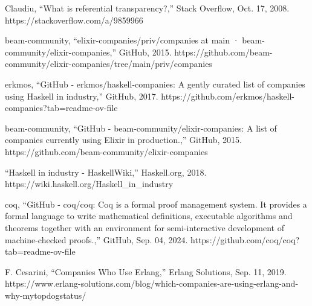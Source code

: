 \documentclass[12pt]{report} %
\begin{document}
\begin{singlespace}
\begin{thebibliography}{}
             Claudiu, “What is referential transparency?,” Stack Overflow, Oct. 17, 2008. https://stackoverflow.com/a/9859966

             beam-community, “elixir-companies/priv/companies at main · beam-community/elixir-companies,” GitHub, 2015. https://github.com/beam-community/elixir-companies/tree/main/priv/companies

             erkmos, “GitHub - erkmos/haskell-companies: A gently curated list of companies using Haskell in industry,” GitHub, 2017. https://github.com/erkmos/haskell-companies?tab=readme-ov-file

             beam-community, “GitHub - beam-community/elixir-companies: A list of companies currently using Elixir in production.,” GitHub, 2015. https://github.com/beam-community/elixir-companies

             “Haskell in industry - HaskellWiki,” Haskell.org, 2018. https://wiki.haskell.org/Haskell\_in\_industry

             coq, “GitHub - coq/coq: Coq is a formal proof management system. It provides a formal language to write mathematical definitions, executable algorithms and theorems together with an environment for semi-interactive development of machine-checked proofs.,” GitHub, Sep. 04, 2024. https://github.com/coq/coq?tab=readme-ov-file

             F. Cesarini, “Companies Who Use Erlang,” Erlang Solutions, Sep. 11, 2019. https://www.erlang-solutions.com/blog/which-companies-are-using-erlang-and-why-mytopdogstatus/

        \end{thebibliography}

    

    \end{singlespace}
\end{document}
